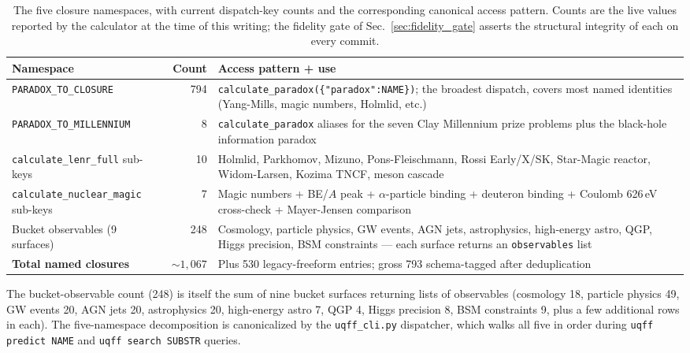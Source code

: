 \begin{table}[H]
\centering
\caption{The five closure namespaces, with current dispatch-key
counts and the corresponding canonical access pattern. Counts are
the live values reported by the calculator at the time of this
writing; the fidelity gate of Sec.~\ref{sec:fidelity_gate} asserts
the structural integrity of each on every commit.}
\label{tab:five_namespaces}
\begin{tabular}{l r p{6.5cm}}
\toprule
\textbf{Namespace} & \textbf{Count} & \textbf{Access pattern + use} \\
\midrule
\texttt{PARADOX\_TO\_CLOSURE} & 794 & \texttt{calculate\_paradox(\{"paradox":NAME\})}; the broadest dispatch, covers most named identities (Yang-Mills, magic numbers, Holmlid, etc.) \\
\texttt{PARADOX\_TO\_MILLENNIUM} & 8 & \texttt{calculate\_paradox} aliases for the seven Clay Millennium prize problems plus the black-hole information paradox \\
\texttt{calculate\_lenr\_full} sub-keys & 10 & Holmlid, Parkhomov, Mizuno, Pons-Fleischmann, Rossi Early/X/SK, Star-Magic reactor, Widom-Larsen, Kozima TNCF, meson cascade \\
\texttt{calculate\_nuclear\_magic} sub-keys & 7 & Magic numbers + BE/$A$ peak + $\alpha$-particle binding + deuteron binding + Coulomb 626\,eV cross-check + Mayer-Jensen comparison \\
Bucket observables (9 surfaces) & 248 & Cosmology, particle physics, GW events, AGN jets, astrophysics, high-energy astro, QGP, Higgs precision, BSM constraints --- each surface returns an \texttt{observables} list \\
\midrule
\textbf{Total named closures} & \textbf{$\sim 1{,}067$} & Plus 530 legacy-freeform entries; gross 793 schema-tagged after deduplication \\
\bottomrule
\end{tabular}
\end{table}

The bucket-observable count (248) is itself the sum of nine bucket
surfaces returning lists of observables (cosmology 18, particle
physics 49, GW events 20, AGN jets 20, astrophysics 20, high-energy
astro 7, QGP 4, Higgs precision 8, BSM constraints 9, plus a few
additional rows in each). The five-namespace decomposition is
canonicalized by the \texttt{uqff\_cli.py} dispatcher, which walks
all five in order during \texttt{uqff predict NAME} and
\texttt{uqff search SUBSTR} queries.

